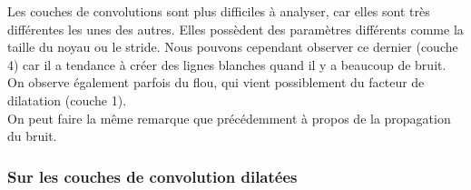 \documentclass[12pt]{article}
\begin{document}
Les couches de convolutions sont plus difficiles à analyser, car elles sont très différentes les unes des autres. Elles possèdent des paramètres différents comme la taille du noyau ou le stride. Nous pouvons cependant observer ce dernier (couche 4) car il a tendance à créer des lignes blanches quand il y a beaucoup de bruit. On observe également parfois du flou, qui vient possiblement du facteur de dilatation (couche 1).\\

On peut faire la même remarque que précédemment à propos de la propagation du bruit.
\newpage
\subsubsection*{Sur les couches de convolution dilatées}
\begin{figure}[htb]
\centering
  \hfill
  \hfill
  \subfloat{%
}
\end{figure}
\end{document}
